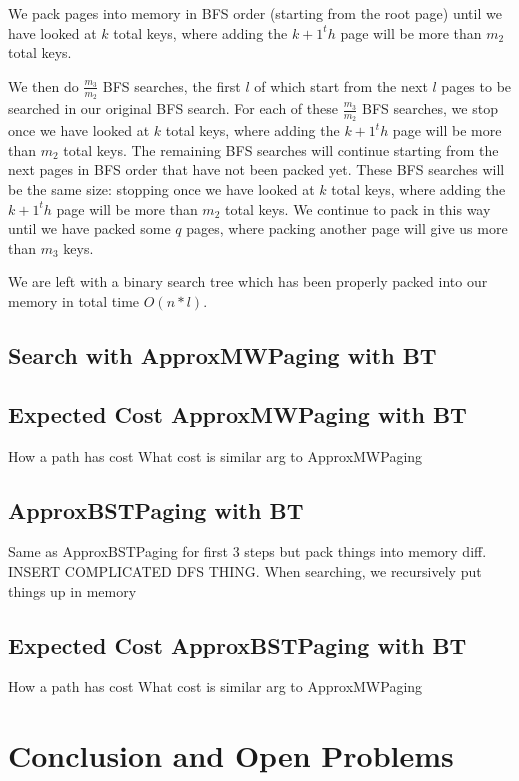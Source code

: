 \documentclass[letterpaper,12pt,titlepage,oneside,final]{book}
\theoremstyle{plain}
\begin{document}
\fi


We pack pages into memory in BFS order (starting from the root page) until we have looked at $k$ total keys, where adding the $k+1^th$ page will be more than $m_2$ total keys.

We then do $\frac{m_3}{m_2}$ BFS searches, the first $l$ of which start from the next $l$ pages to be searched in our original BFS search. For each of these $\frac{m_3}{m_2}$ BFS searches, we stop once we have looked at  $k$ total keys, where adding the $k+1^th$ page will be more than $m_2$ total keys. The remaining BFS searches will continue starting from the next pages in BFS order that have not been packed yet. These BFS searches will be the same size: stopping once we have looked at  $k$ total keys, where adding the $k+1^th$ page will be more than $m_2$ total keys. We continue to pack in this way until we have packed some $q$ pages, where packing another page will give us more than $m_3$ keys.


We are left with a binary search tree which has been properly packed into our memory in total time $O(n * l)$.

\section{Search with ApproxMWPaging with BT}




\section{Expected Cost ApproxMWPaging with BT}

How a path has cost
What cost is
similar arg to ApproxMWPaging


\section{ApproxBSTPaging with BT}
Same as ApproxBSTPaging for first 3 steps but pack things into memory diff. INSERT COMPLICATED DFS THING.
When searching, we recursively put things up in memory


\section{Expected Cost ApproxBSTPaging with BT}
How a path has cost
What cost is
similar arg to ApproxMWPaging

\chapter{Conclusion and Open Problems}
\end{document}
